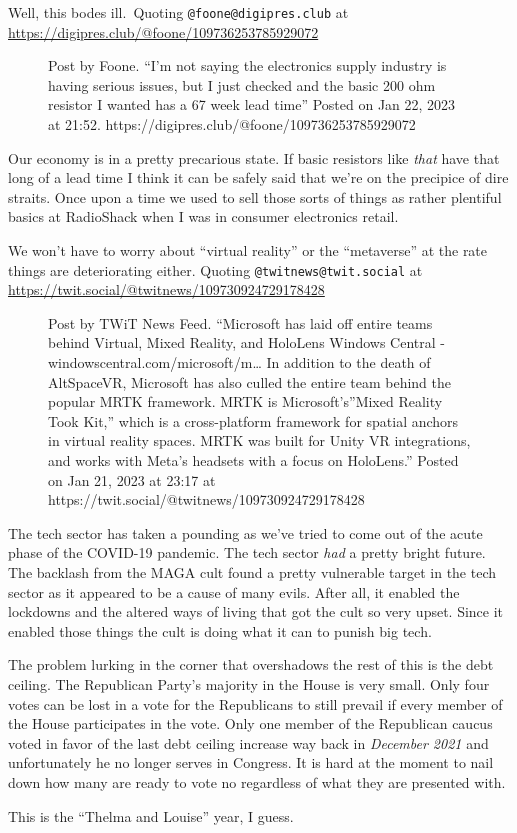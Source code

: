 Well, this bodes ill.~Quoting \texttt{@foone@digipres.club} at
\url{https://digipres.club/@foone/109736253785929072}

\begin{figure}
\centering
{}
\caption{Post by Foone. ``I'm not saying the electronics supply industry
is having serious issues, but I just checked and the basic 200 ohm
resistor I wanted has a 67 week lead time'' Posted on Jan 22, 2023 at
21:52. https://digipres.club/@foone/109736253785929072}
\end{figure}

Our economy is in a pretty precarious state. If basic resistors like
\emph{that} have that long of a lead time I think it can be safely said
that we're on the precipice of dire straits. Once upon a time we used to
sell those sorts of things as rather plentiful basics at RadioShack when
I was in consumer electronics retail.

We won't have to worry about ``virtual reality'' or the ``metaverse'' at
the rate things are deteriorating either. Quoting
\texttt{@twitnews@twit.social} at
\url{https://twit.social/@twitnews/109730924729178428}

\begin{figure}
\centering
{}
\caption{Post by TWiT News Feed. ``Microsoft has laid off entire teams
behind Virtual, Mixed Reality, and HoloLens Windows Central -
windowscentral.com/microsoft/m\ldots{} In addition to the death of
AltSpaceVR, Microsoft has also culled the entire team behind the popular
MRTK framework. MRTK is Microsoft's''Mixed Reality Took Kit,'' which is
a cross-platform framework for spatial anchors in virtual reality
spaces. MRTK was built for Unity VR integrations, and works with Meta's
headsets with a focus on HoloLens.'' Posted on Jan 21, 2023 at 23:17 at
https://twit.social/@twitnews/109730924729178428}
\end{figure}

The tech sector has taken a pounding as we've tried to come out of the
acute phase of the COVID-19 pandemic. The tech sector \emph{had} a
pretty bright future. The backlash from the MAGA cult found a pretty
vulnerable target in the tech sector as it appeared to be a cause of
many evils. After all, it enabled the lockdowns and the altered ways of
living that got the cult so very upset. Since it enabled those things
the cult is doing what it can to punish big tech.

The problem lurking in the corner that overshadows the rest of this is
the debt ceiling. The Republican Party's majority in the House is very
small. Only four votes can be lost in a vote for the Republicans to
still prevail if every member of the House participates in the vote.
Only one member of the Republican caucus voted in favor of the last debt
ceiling increase way back in \emph{December 2021} and unfortunately he
no longer serves in Congress. It is hard at the moment to nail down how
many are ready to vote no regardless of what they are presented with.

This is the ``Thelma and Louise'' year, I guess.
